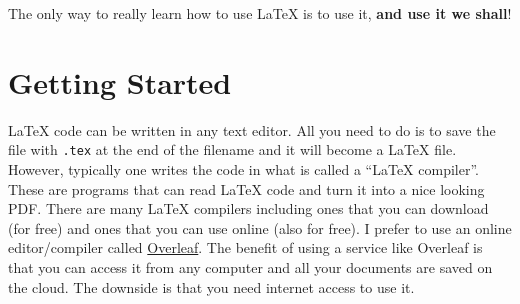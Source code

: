 \documentclass[11pt]{article}
\begin{document}
The only  way to really learn how to use LaTeX is to use it, \textbf{and use it we shall}! 

\section{Getting Started}

LaTeX code can be written in any text editor.
All you need to do is to save the file with \texttt{.tex} at the end of the filename and it will become a LaTeX file.
However, typically one writes the code in what is called a ``LaTeX compiler''.
These are programs that can read LaTeX code and turn it into a nice looking PDF.
There are many LaTeX compilers including ones that you can download (for free) and ones that you can use online (also for free).
I prefer to use an online editor/compiler called \href{https://www.overleaf.com/}{Overleaf}.
The benefit of using a service like Overleaf is that you can access it from any computer and all your documents are saved on the cloud.
The downside is that you need internet access to use it.
\end{document}
